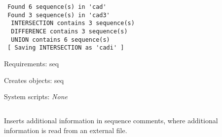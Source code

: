 \begin{description}
\begin{enumerate}
\begin{verbatim}
 Found 6 sequence(s) in 'cad'
 Found 3 sequence(s) in 'cad3'
  INTERSECTION contains 3 sequence(s)
  DIFFERENCE contains 3 sequence(s)
  UNION contains 6 sequence(s)
 [ Saving INTERSECTION as 'cadi' ]

\end{verbatim}

\end{enumerate}


\item{Requirements:} seq


\item{Creates objects:} seq


\item{System scripts:} {\em None}

\end{description}




\subsection[seq\_os]{  }



Inserts additional information in sequence comments, where
additional information is read from an external file.


